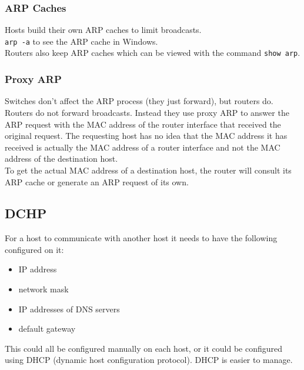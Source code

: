 \subsubsection{ARP Caches}

Hosts build their own ARP caches to limit broadcasts.\\

\texttt{arp -a} to see the ARP cache in Windows.\\

Routers also keep ARP caches which can be viewed with the command
\texttt{show arp}.

\subsubsection{Proxy ARP}

Switches don't affect the ARP process (they just forward), but routers do.\\

Routers do not forward broadcasts. Instead they use proxy ARP to answer the
ARP request with the MAC address of the router interface that received the
original request. The requesting host has no idea that the MAC address it
has received is actually the MAC address of a router interface and not the
MAC address of the destination host.\\

To get the actual MAC address of a destination host, the router will consult
its ARP cache or generate an ARP request of its own.

\subsection{DCHP}

For a host to communicate with another host it needs to have the following
configured on it:

\begin{itemize}

\item IP address
\item network mask
\item IP addresses of DNS servers
\item default gateway

\end{itemize}

This could all be configured manually on each host, or it could be configured
using DHCP (dynamic host configuration protocol). DHCP is easier to manage.

